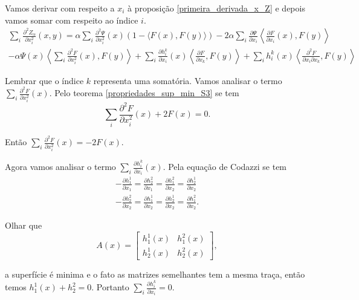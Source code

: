 \begin{demonstracao}
	Vamos derivar com respeito a $x_i$ à proposição \ref{primeira_derivada_x_Z} e depois vamos somar com respeito ao índice $i$.
	\begin{multline}\label{Z_seg_dev_x}
		\sum_i \frac{\partial^2 Z_{\alpha}}{\partial x_i^2}(x,y) = \alpha \sum_i \frac{\partial^2 \Psi}{\partial x_i^2}(x)(1 - \langle F(x), F(y) \rangle) -2 \alpha \sum_i \frac{\partial \Psi}{\partial x_i} \left\langle \frac{\partial F}{\partial x_i}(x), F(y) \right\rangle\\
		 - \alpha \Psi(x) \left\langle \sum_i \frac{\partial^2 F}{\partial x_i^2}(x), F(y) \right\rangle + \sum_i \frac{\partial h_i^k}{\partial x_i}(x) \left\langle \frac{\partial F}{\partial x_k}, F(y) \right\rangle + \sum_i h_i^k(x) \left\langle \frac{\partial^2 F}{\partial x_i \partial x_k}, F(y) \right\rangle
	\end{multline}
	
	Lembrar que o índice $k$ representa uma somatória. Vamos analisar o termo $\sum_i \frac{\partial^2 F}{\partial x_i^2}(x)$. Pelo teorema \ref{propriedades_sup_min_S3} se tem
	\begin{equation*}
		\sum_i \frac{\partial^2 F}{\partial x_i^2}(x) + 2 F(x) = 0.
	\end{equation*}
	
	Então $\sum_i \frac{\partial^2 F}{\partial x_i^2}(x) = -2 F(x) $.
	
	Agora vamos analisar o termo $\sum_i \frac{\partial h_i^k}{\partial x_i}(x)$. Pela equação de Codazzi se tem
	\begin{align*}
		-\frac{\partial h_1^1}{\partial x_1} = \frac{\partial h_2^2}{\partial x_1} = \frac{\partial h_1^2}{\partial x_2} = \frac{\partial h_2^1}{\partial x_2}\\
		-\frac{\partial h_2^2}{\partial x_2} = \frac{\partial h_1^1}{\partial x_2} = \frac{\partial h_2^1}{\partial x_2} = \frac{\partial h_1^2}{\partial x_2}.
	\end{align*}
	
	Olhar que 
	\begin{equation*}
		A(x) = \left[\begin{matrix}
		h_1^1(x) & h_1^2(x)\\
		h_2^1(x) & h_2^2(x)
		\end{matrix}\right],
	\end{equation*}
	
	a superfície é minima e o fato as matrizes semelhantes tem a mesma traça, então temos $h_1^1(x) + h_2^2 = 0$. Portanto $\sum_i \frac{\partial h_i^k}{\partial x_i} = 0$.
	

\end{demonstracao}

